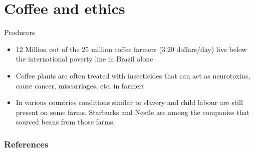 \documentclass[10pt,graphics,aspectratio=169,table]{beamer}
\begin{document}
\section{Coffee and ethics}
\begin{frame}{Producers}
    \begin{itemize}
    \item 12 Million out of the 25 million coffee farmers (3.20 dollars/day) live below the international poverty line in Brazil alone
    \item Coffee plants are often treated with insecticides that can act as neurotoxins, cause cancer, miscarriages, etc. in farmers
    \item In various countries conditions similar to slavery and child labour are still present on some farms. Starbucks and Nestle are among the companies that sourced beans from those farms. \cite{reportBrazil}
\end{itemize}
\end{frame}


\begin{frame}[allowframebreaks]
        \frametitle{References}
        
        \nocite{*}
        
\end{frame}
\end{document}
